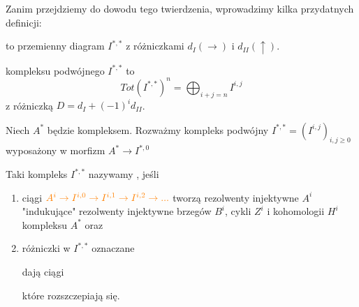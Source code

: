 Zanim przejdziemy do dowodu tego twierdzenia, wprowadzimy kilka przydatnych definicji:

  \begin{definition}
     to przemienny diagram $I^{*,*}$ z różniczkami $d_I(\to)$ i $d_{II}(\uparrow)$.

     kompleksu podwójnego $I^{*,*}$ to 
    $$Tot(I^{*,*})^n=\bigoplus_{i+j=n}I^{i,j}$$
    z różniczką $D=d_I+(-1)^id_{II}$. 
  \end{definition}

  \begin{definition}
    Niech $A^*$ będzie kompleksem. Rozważmy kompleks podwójny $I^{*,*}=(I^{i,j})_{i,j\geq 0}$ wyposażony w morfizm $A^*\to I^{*,0}$

    \begin{center}
    \end{center}

    Taki kompleks $I^{*,*}$ nazywamy , jeśli
    \begin{enumerate}
      \item ciągi $\color{orange}A^i\to I^{i,0}\to I^{i, 1}\to I^{i,2} \to ...$ tworzą rezolwenty injektywne $A^i$ "indukujące" rezolwenty injektywne brzegów $B^i$, cykli $Z^i$ i kohomologii $H^i$ kompleksu $A^*$ oraz
      \item różniczki w $I^{*,*}$ oznaczane
    \begin{center}\end{center}
    dają ciągi 
    \begin{center}\end{center}
    które rozszczepiają się.
\end{enumerate}
  \end{definition}

